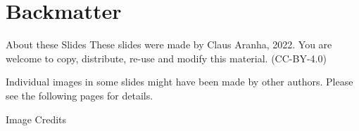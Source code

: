 \section{Backmatter}
\begin{frame}{About these Slides}
  These slides were made by Claus Aranha, 2022. You are welcome to copy, distribute, re-use and modify this material.
  (CC-BY-4.0)
  \bigskip

  Individual images in some slides might have been made by other
  authors. Please see the following pages for details.
\end{frame}

\begin{frame}[allowframebreaks]{Image Credits}
  \printnotes
\end{frame}
